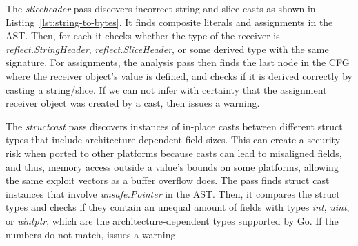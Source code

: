The \textit{sliceheader} pass discovers incorrect string and slice casts as shown in Listing~\ref{lst:string-to-bytes}.
It finds composite literals and assignments in the AST.
Then, for each it checks whether the type of the %
receiver is \textit{reflect.StringHeader}, \textit{reflect.SliceHeader}, or some derived type with the same signature.
For assignments, the analysis pass then finds the last node in the CFG where the receiver object's value is defined, and checks if it is derived correctly by casting a string/slice.
If we can not infer with certainty that the assignment receiver object was created by a cast, then \toolSA{} issues a warning.

The \textit{structcast} pass discovers instances of in-place casts between different struct types that include architecture-dependent field sizes. 
This can create a security risk when ported to other platforms because \unsafe{} casts can lead to misaligned fields, and thus, memory access outside a value's bounds on some platforms, allowing the same exploit vectors as a buffer overflow does.
The pass finds struct cast instances that involve \textit{unsafe.Pointer} in the AST.
Then, it compares the struct types and checks if they contain an unequal amount of fields with types \textit{int}, \textit{uint}, or \textit{uintptr}, which are the architecture-dependent types supported by Go.
If the numbers do not match, \toolSA{} issues a warning.

